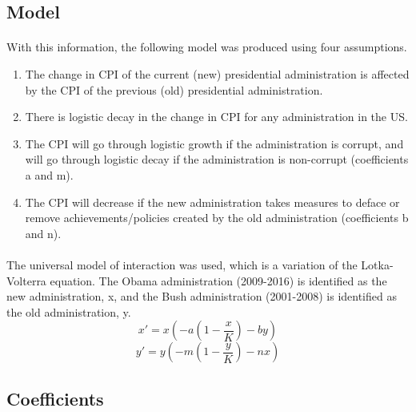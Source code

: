 \documentclass{article}
\begin{document}
		\subsection{Model}
		\paragraph{}
		With this information, the following model was produced using four assumptions.
		\begin{enumerate}
		\item The change in CPI of the current (new) presidential administration is affected by the CPI of the previous (old) presidential administration.
		\item There is logistic decay in the change in CPI for any administration in the US.
		\item The CPI will go through logistic growth if the administration is corrupt, and will go through logistic decay if the administration is non-corrupt (coefficients a and m).
		\item The CPI will decrease if the new administration takes measures to deface or remove achievements/policies created by the old administration (coefficients b and n).
		\end{enumerate}
		\paragraph{}
		The universal model of interaction was used, which is a variation of the Lotka-Volterra equation. The Obama administration (2009-2016) is identified as the new administration, x, and the Bush administration (2001-2008) is identified as the old administration, y.
		\begin{equation}
		x'=x(-a(1-\frac{x}{K})-by)
		\end{equation}
		\begin{equation}
		y'=y(-m(1-\frac{y}{K})-nx)
		\end{equation}
		

		\subsection{Coefficients}
\end{document}
